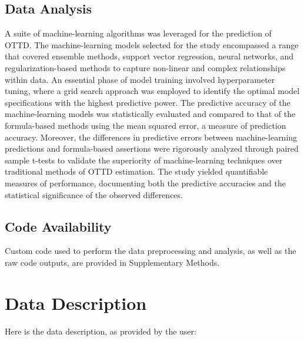 \documentclass[11pt]{article}
\begin{document}
\subsection*{Data Analysis}
A suite of machine-learning algorithms was leveraged for the prediction of OTTD. The machine-learning models selected for the study encompassed a range that covered ensemble methods, support vector regression, neural networks, and regularization-based methods to capture non-linear and complex relationships within data. An essential phase of model training involved hyperparameter tuning, where a grid search approach was employed to identify the optimal model specifications with the highest predictive power. The predictive accuracy of the machine-learning models was statistically evaluated and compared to that of the formula-based methods using the mean squared error, a measure of prediction accuracy. Moreover, the differences in predictive errors between machine-learning predictions and formula-based assertions were rigorously analyzed through paired sample t-tests to validate the superiority of machine-learning techniques over traditional methods of OTTD estimation. The study yielded quantifiable measures of performance, documenting both the predictive accuracies and the statistical significance of the observed differences.\subsection*{Code Availability}

Custom code used to perform the data preprocessing and analysis, as well as the raw code outputs, are provided in Supplementary Methods.






\clearpage
\appendix

\section{Data Description} \label{sec:data_description} Here is the data description, as provided by the user:
\end{document}
